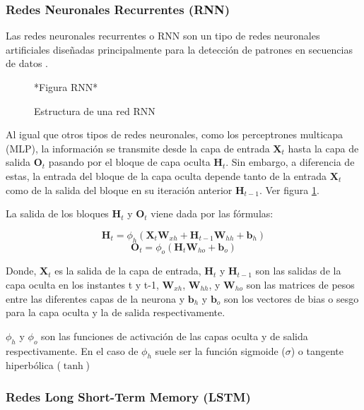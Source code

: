 \documentclass[a4paper,12pt]{article}
\begin{document}
\subsubsection{Redes Neuronales Recurrentes (RNN)}

Las redes neuronales recurrentes o RNN son un tipo de redes neuronales
artificiales diseñadas principalmente para la detección de patrones
en secuencias de datos \cite{RNN}.

\begin{figure}[h]
    *Figura RNN*
    \caption{Estructura de una red RNN}
    \label{fig:RNN}
\end{figure}

Al igual que otros tipos de redes neuronales, como los perceptrones
multicapa (MLP), la información se transmite desde la capa de entrada
$\mathbf{X}_{t}$ hasta la capa de salida $\mathbf{O}_{t}$ pasando
por el bloque de capa oculta $\mathbf{H}_{t}$. Sin embargo, 
a diferencia de estas, la entrada del bloque de la capa oculta
depende tanto de la entrada $\mathbf{X}_{t}$ como de la salida 
del bloque en su iteración anterior $\mathbf{H}_{t-1}$. Ver figura
\ref{fig:RNN}.

La salida de los bloques $\mathbf{H}_{t}$ y $\mathbf{O}_{t}$ viene
dada por las fórmulas:

\begin{equation}
    \mathbf{H}_{t} = \phi_{h}( \mathbf{X}_{t}\mathbf{W}_{xh} 
    + \mathbf{H}_{t-1}\mathbf{W}_{hh}+\mathbf{b}_{h} ) 
    \label{eq:rnn_ht}
\end{equation}
\begin{equation}
    \label{eq:rnn_ot}
    \mathbf{O}_{t} = \phi_{o} ( \mathbf{H}_{t} \mathbf{W}_{ho}
    + \mathbf{b}_{o})
\end{equation}

Donde, $\mathbf{X}_{t}$ es la salida de la capa de entrada,
$\mathbf{H}_{t}$ y $\mathbf{H}_{t-1}$ son las salidas de la capa 
oculta en los instantes t y t-1, $\mathbf{W}_{xh}$, $\mathbf{W}_{hh}$,
y $\mathbf{W}_{ho}$ son las matrices de pesos entre las diferentes
capas de la neurona y $\mathbf{b}_{h}$ y $\mathbf{b}_{o}$ son los
vectores de bias o sesgo para la capa oculta y la de salida
respectivamente.

$\phi_{h}$ y $\phi_{o}$ son las funciones de activación 
de las capas oculta y de salida respectivamente. En el caso
de $\phi_{h}$ suele ser la función sigmoide ($\sigma$) o 
tangente hiperbólica ($\tanh$)

\subsubsection{Redes Long Short-Term Memory (LSTM)}
\end{document}
